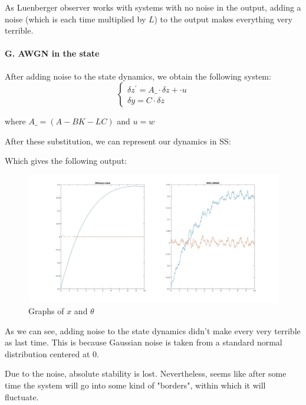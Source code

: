 \documentclass{article}
\begin{document}
\noindent
As Luenberger observer works with systems with no noise in the output, adding a noise (which is each time multiplied by $L$) to the output makes everything very terrible.

\paragraph{G. AWGN in the state}
\leavevmode

\noindent
After adding noise to the state dynamics, we obtain the following system:
$$
    \left\{ \begin{array}{ll} 
        \delta z^\prime = A\_ \cdot \delta z + \cdot u\\
        \delta y = C \cdot \delta z
    \end{array} \right.
    $$

\noindent
where $A\_ =  (A - BK - LC) $ and $u = w$


\noindent
After these substitution, we can represent our dynamics in SS: 


\noindent
Which gives the following output:

\noindent
\begin{figure}[hbt!]
        \centering
        \includegraphics[scale=0.2]{task_g.jpg}
        \caption{Graphs of $x$ and $\theta$}
\end{figure}

\noindent
As we can see, adding noise to the state dynamics didn't make every very terrible as last time. This is because Gaussian noise is taken from a standard normal distribution centered at 0. 

\noindent
Due to the noise, absolute stability is lost. Nevertheless, seems like after some time the system will go into some kind of "borders", within which it will fluctuate.
\end{document}

